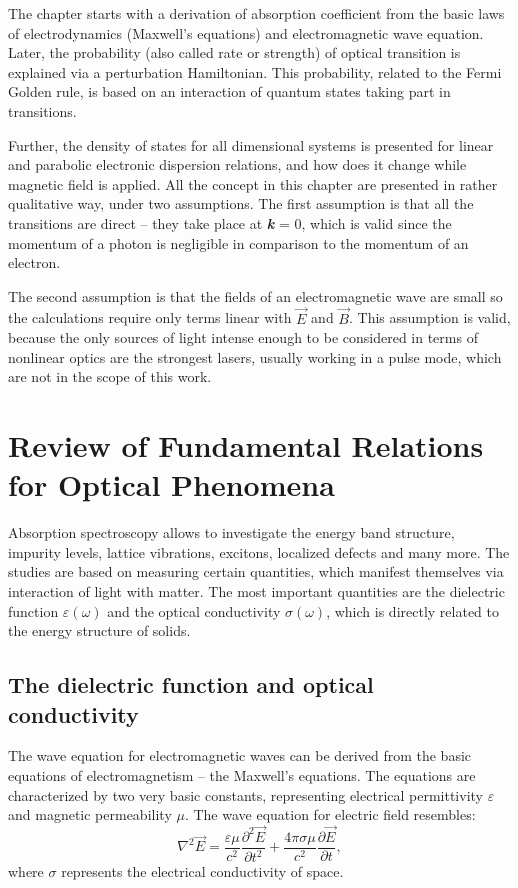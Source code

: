 \documentclass[titlepage,a4paper]{book}
\newcommand{\wciecie}{\quad\phantom{v}}
\begin{document}
The chapter starts with a derivation of absorption coefficient from the basic laws of electrodynamics (Maxwell's equations) and electromagnetic wave equation. Later, the probability (also called rate or strength) of optical transition is explained via a perturbation Hamiltonian. This probability, related to the Fermi Golden rule, is based on an interaction of quantum states taking part in transitions. 

Further, the density of states for all dimensional systems is presented for linear and parabolic electronic dispersion relations, and how does it change while magnetic field is applied. All the concept in this chapter are presented in rather qualitative way, under two assumptions. The first assumption is that all the transitions are direct -- they take place at \textbf{\textit{k}} = 0, which is valid since the momentum of a photon is negligible in comparison to the momentum of an electron. 

The second assumption is that the fields of an electromagnetic wave are small so the calculations require only terms linear with $\vec{E}$ and $\vec{B}$. This assumption is valid, because the only sources of light intense enough to be considered in terms of nonlinear optics are the strongest lasers, usually working in a pulse mode, which are not in the scope of this work. 
 
\section{Review of Fundamental Relations for Optical Phenomena}
\wciecie
Absorption spectroscopy allows to investigate the energy band structure, impurity levels, lattice vibrations, excitons, localized defects and many more. The studies are based on measuring certain quantities, which manifest themselves via interaction of light with matter. The most important quantities are the dielectric function $\varepsilon (\omega)$ and the optical conductivity $\sigma (\omega)$, which is directly related to the energy structure of solids. 
\subsection{The dielectric function and optical conductivity}
\label{section:Maxwell_equations}
\wciecie
The wave equation for electromagnetic waves can be derived from the basic equations of electromagnetism -- the Maxwell's equations. The equations are characterized by two very basic constants, representing electrical permittivity $\varepsilon$ and magnetic permeability $\mu$. The wave equation for electric field resembles:
\begin{equation}
\label{eq:Wave_E}
\nabla^2 \vec{E} = \frac{\varepsilon \mu}{c^2} \frac{\partial^2 \vec{E}}{\partial t^2} + \frac{4\pi \sigma \mu}{c^2} \frac{\partial \vec{E}}{\partial t},
\end{equation}
where $\sigma$ represents the electrical conductivity of space. 
\end{document}
